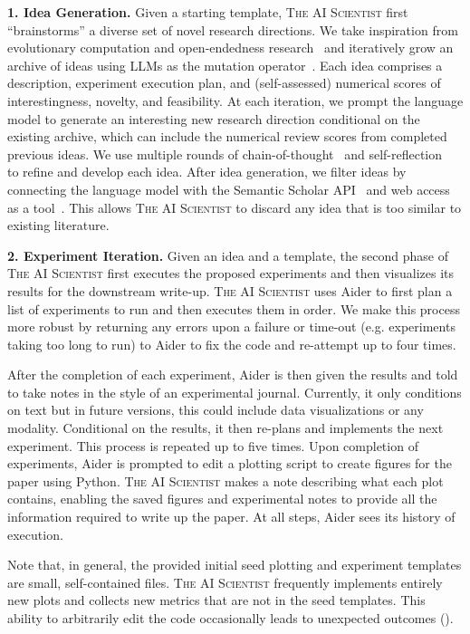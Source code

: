 \documentclass[11pt, a4paper]{include/gdm_format}
\newcommand{\ouralgo}{\textsc{The AI Scientist}\xspace}
\begin{document}
\textbf{1. Idea Generation.}
Given a starting template, \ouralgo first ``brainstorms'' a diverse set of novel research directions.
We take inspiration from evolutionary computation and open-endedness research~\citep{brant2017minimal,lehman2008exploiting,stanley2017open,stanley2019open} and iteratively grow an archive of ideas using LLMs as the mutation operator~\citep{zhang2024omni, omniepic, ige, lehman2022evolutionlargemodels}.
Each idea comprises a description, experiment execution plan, and (self-assessed) numerical scores of interestingness, novelty, and feasibility.
At each iteration, we prompt the language model to generate an interesting new research direction conditional on the existing archive, which can include the numerical review scores from completed previous ideas.
We use multiple rounds of chain-of-thought~\citep{wei2022chain} and self-reflection~\citep{shinn2024reflexion} to refine and develop each idea.
After idea generation, we filter ideas by connecting the language model with the Semantic Scholar API~\citep{fricke2018semantic} and web access as a tool~\citep{schick2024toolformer}.
This allows \ouralgo to discard any idea that is too similar to existing literature.

\textbf{2. Experiment Iteration.} %
Given an idea and a template, the second phase of \ouralgo first executes the proposed experiments and then visualizes its results for the downstream write-up.
\ouralgo uses Aider to first plan a list of experiments to run and then executes them in order.
We make this process more robust by returning any errors upon a failure or time-out (e.g. experiments taking too long to run) to Aider to fix the code and re-attempt up to four times.

After the completion of each experiment, Aider is then given the results and told to take notes in the style of an experimental journal.
Currently, it only conditions on text but in future versions, this could include data visualizations or any modality.
Conditional on the results, it then re-plans and implements the next experiment.
This process is repeated up to five times.
Upon completion of experiments, Aider is prompted to edit a plotting script to create figures for the paper using Python.
\ouralgo makes a note describing what each plot contains, enabling the saved figures and experimental notes to provide all the information required to write up the paper.
At all steps, Aider sees its history of execution.

Note that, in general, the provided initial seed plotting and experiment templates are small, self-contained files. \ouralgo frequently implements entirely new plots and collects new metrics that are not in the seed templates. This ability to arbitrarily edit the code occasionally leads to unexpected outcomes ().
\end{document}
